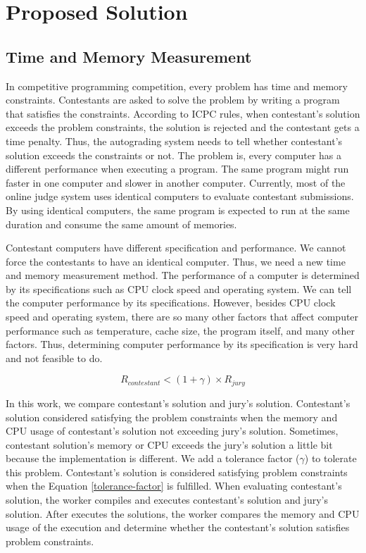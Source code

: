 \documentclass[conference,a4paper]{IEEEtran}
\begin{document}
\section{Proposed Solution}

\subsection{Time and Memory Measurement}

In competitive programming competition, every problem has time and memory constraints. Contestants are asked to solve the problem by writing a program that satisfies the constraints. According to ICPC rules, when contestant's solution exceeds the problem constraints, the solution is rejected and the contestant gets a time penalty. Thus, the autograding system needs to tell whether contestant's solution exceeds the constraints or not. The problem is, every computer has a different performance when executing a program. The same program might run faster in one computer and slower in another computer. Currently, most of the online judge system uses identical computers to evaluate contestant submissions. By using identical computers, the same program is expected to run at the same duration and consume the same amount of memories.

Contestant computers have different specification and performance. We cannot force the contestants to have an identical computer. Thus, we need a new time and memory measurement method. The performance of a computer is determined by its specifications such as CPU clock speed and operating system. We can tell the computer performance by its specifications. However, besides CPU clock speed and operating system, there are so many other factors that affect computer performance such as temperature, cache size, the program itself, and many other factors. Thus, determining computer performance by its specification is very hard and not feasible to do.

\begin{equation}\label{tolerance-factor}
R_{contestant} < (1 + \gamma) \times R_{jury}
\end{equation}

In this work, we compare contestant's solution and jury's solution. Contestant's solution considered satisfying the problem constraints when the memory and CPU usage of contestant's solution not exceeding jury's solution. Sometimes, contestant solution's memory or CPU exceeds the jury's solution a little bit because the implementation is different. We add a tolerance factor ($\gamma$) to tolerate this problem. Contestant's solution is considered satisfying problem constraints when the Equation \ref{tolerance-factor} is fulfilled. When evaluating contestant's solution, the worker compiles and executes contestant's solution and jury's solution. After executes the solutions, the worker compares the memory and CPU usage of the execution and determine whether the contestant's solution satisfies problem constraints. 
\end{document}
